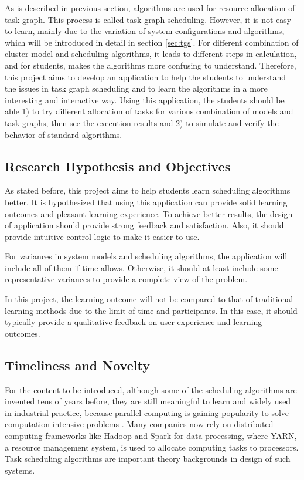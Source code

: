 \documentclass[a4paper,11pt]{article}
\begin{document}
As is described in previous section, algorithms are used for resource allocation of task graph. This process is called task graph scheduling. However, it is not easy to learn, mainly due to the variation of system configurations and algorithms, which will be introduced in detail in section \ref{sec:tgs}. For different combination of cluster model and scheduling algorithms, it leads to different steps in calculation, and for students, makes the algorithms more confusing to understand. Therefore, this project aims to develop an application to help the students to understand the issues in task graph scheduling and to learn the algorithms in a more interesting and interactive way.  Using this application, the students should be able 1) to try different allocation of tasks for various combination of models and task graphs, then see the execution results and 2) to simulate and verify the behavior of standard algorithms.

\subsection{Research Hypothesis and Objectives} \label{sec:obj}

As stated before, this project aims to help students learn scheduling algorithms better. It is hypothesized that using this application can provide solid learning outcomes and pleasant learning experience. To achieve better results, the design of application should provide strong feedback and satisfaction. Also, it should provide intuitive control logic to make it easier to use.

For variances in system models and scheduling algorithms, the application will include all of them if time allows. Otherwise, it should at least include some representative variances to provide a complete view of the problem.

In this project, the learning outcome will not be compared to that of traditional learning methods due to the limit of time and participants. In this case, it should typically provide a qualitative feedback on user experience and learning outcomes.

\subsection{Timeliness and Novelty}

For the content to be introduced, although some of the scheduling algorithms are invented tens of years before, they are still meaningful to learn and widely used in industrial practice, because parallel computing is gaining popularity to solve computation intensive problems \cite{Taboada2013}. Many companies now rely on distributed computing frameworks like Hadoop and Spark for data processing, where YARN, a resource management system, is used to allocate computing tasks to processors. Task scheduling algorithms are important theory backgrounds in design of such systems. 
\end{document}
